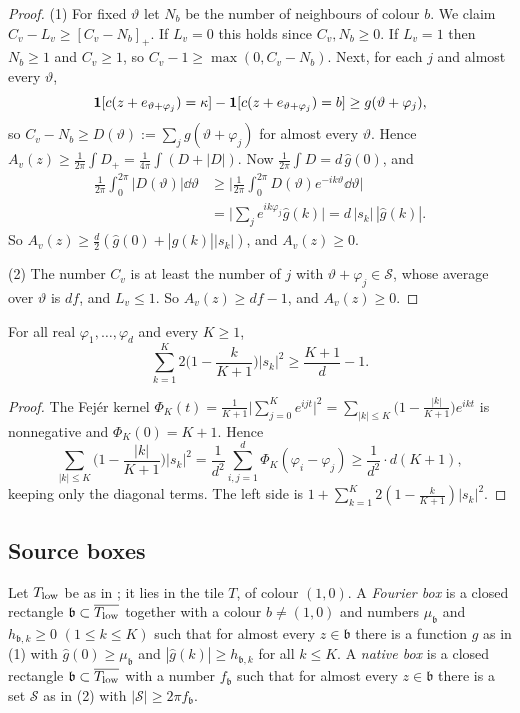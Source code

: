\documentclass[11pt,colorlinks]{charlie}
\newcommand{\pos}[1]{\left[#1\right]_+}
\begin{document}
\begin{proof}
(1) For fixed $\vartheta$ let $N_b$ be the number of neighbours of colour $b$. We claim $C_v-L_v\ge\pos{C_v-N_b}$. If $L_v=0$ this holds since $C_v,N_b\ge0$. If $L_v=1$ then $N_b\ge1$ and $C_v\ge1$, so $C_v-1\ge\max(0,C_v-N_b)$. Next, for each $j$ and almost every $\vartheta$,
\[
 \mathbf{1}[c(z+e_{\vartheta+\varphi_j})=\kappa]-\mathbf{1}[c(z+e_{\vartheta+\varphi_j})=b]\ge g(\vartheta+\varphi_j),
\]
so $C_v-N_b\ge D(\vartheta):=\sum_jg(\vartheta+\varphi_j)$ for almost every $\vartheta$. Hence $A_v(z)\ge\frac1{2\pi}\int D_+=\frac1{4\pi}\int(D+|D|)$. Now $\frac1{2\pi}\int D=d\,\hat g(0)$, and
\begin{align*}
 \frac1{2\pi}\int_0^{2\pi}|D(\vartheta)|\dd\vartheta&\ge\Big|\frac1{2\pi}\int_0^{2\pi}D(\vartheta)e^{-ik\vartheta}\dd\vartheta\Big|\\
 &=\Big|\sum_je^{ik\varphi_j}\hat g(k)\Big|=d\,|s_k|\,|\hat g(k)| .
\end{align*}
So $A_v(z)\ge\frac d2(\hat g(0)+|\hat g(k)||s_k|)$, and $A_v(z)\ge0$.

(2) The number $C_v$ is at least the number of $j$ with $\vartheta+\varphi_j\in\mathcal S$, whose average over $\vartheta$ is $df$, and $L_v\le1$. So $A_v(z)\ge df-1$, and $A_v(z)\ge0$.
\end{proof}

\begin{lemma}[Fej\'er]\label{lem:fejer}
For all real $\varphi_1,\dots,\varphi_d$ and every $K\ge1$,
\[
 \sum_{k=1}^K2\Big(1-\frac k{K+1}\Big)|s_k|^2\ge\frac{K+1}d-1 .
\]
\end{lemma}

\begin{proof}
The Fej\'er kernel $\Phi_K(t)=\frac1{K+1}\big|\sum_{j=0}^Ke^{ijt}\big|^2=\sum_{|k|\le K}\big(1-\frac{|k|}{K+1}\big)e^{ikt}$ is nonnegative and $\Phi_K(0)=K+1$. Hence
\[
 \sum_{|k|\le K}\Big(1-\frac{|k|}{K+1}\Big)|s_k|^2=\frac1{d^2}\sum_{i,j=1}^d\Phi_K(\varphi_i-\varphi_j)\ge\frac1{d^2}\cdot d(K+1),
\]
keeping only the diagonal terms. The left side is $1+\sum_{k=1}^K2(1-\frac k{K+1})|s_k|^2$.
\end{proof}

\subsection{Source boxes}
Let $T_{\rm low}$ be as in ; it lies in the tile $T$, of colour $(1,0)$. A \emph{Fourier box} is a closed rectangle $\mathfrak b\subset\overline{T_{\rm low}}$ together with a colour $b\ne(1,0)$ and numbers $\mu_{\mathfrak b}$ and $h_{\mathfrak b,k}\ge0$ $(1\le k\le K)$ such that for almost every $z\in\mathfrak b$ there is a function $g$ as in (1) with $\hat g(0)\ge\mu_{\mathfrak b}$ and $|\hat g(k)|\ge h_{\mathfrak b,k}$ for all $k\le K$. A \emph{native box} is a closed rectangle $\mathfrak b\subset\overline{T_{\rm low}}$ with a number $f_{\mathfrak b}$ such that for almost every $z\in\mathfrak b$ there is a set $\mathcal S$ as in (2) with $|\mathcal S|\ge2\pi f_{\mathfrak b}$.
\end{document}
